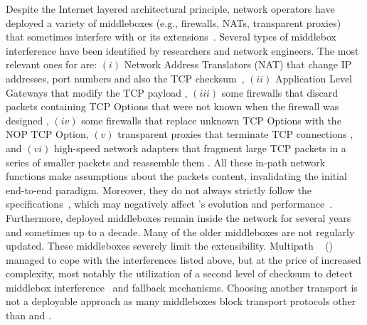 Despite the Internet layered architectural principle, network operators have
deployed a variety of middleboxes (e.g., firewalls, NATs, transparent
proxies)~\cite{mCloud} that sometimes interfere with \tcp or its
extensions~\cite{medina2004measuring, honda2011still, edeline2019bottom}.
Several types of middlebox interference have been identified by researchers and
network engineers. The most relevant ones for \tcp are: $(i)$ Network Address
Translators (NAT) that change IP addresses, port numbers and also the TCP
checksum~\cite{wang2011untold}, $(ii)$ Application Level Gateways that
modify the TCP payload \cite{rfc3207}, $(iii)$ some firewalls that discard
packets containing TCP Options that were not known when the firewall was
designed \cite{edeline2020evaluating}, $(iv)$ some firewalls that replace
unknown TCP Options with the NOP TCP Option, $(v)$ transparent proxies that
terminate TCP connections
\cite{weaver2014here}, and $(vi)$ high-speed network adapters that fragment
large TCP packets in a series of smaller packets and reassemble them
\cite{honda2011still}.
All these in-path network functions make assumptions about the \tcp packets content, invalidating the initial \tcp end-to-end paradigm. Moreover, they do not always strictly follow the \tcp specifications~\cite{honda2011still, hesmans2013tcp}, which may negatively affect \tcp's evolution and performance~\cite{edeline2020evaluating}. Furthermore, deployed middleboxes remain inside the network for several years and sometimes up to a decade. Many of the older middleboxes are not regularly updated.
These middleboxes severely limit the \tcp extensibility. Multipath
\tcp~\cite{rfc8684,raiciu2012hard} (\mptcp) managed to cope with the
interferences listed above, but at the price of increased complexity, most
notably the utilization of a second level of checksum to detect middlebox
interference~\cite{raiciu2012hard,hesmans2013tcp} and fallback mechanisms.
Choosing another transport is not a deployable approach as many middleboxes
block transport protocols other than \tcp and \udp \cite{barik2020usability}.

